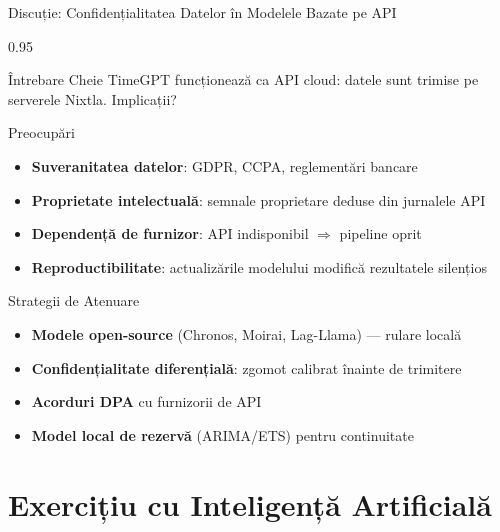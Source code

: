 \documentclass[9pt, aspectratio=169, t]{beamer}
\begin{document}
\begin{frame}{Discuție: Confidențialitatea Datelor în Modelele Bazate pe API}
    \begin{cminipage}{0.95\textwidth}
    {\scriptsize
    \begin{alertblock}{Întrebare Cheie}
        TimeGPT funcționează ca API cloud: datele sunt trimise pe serverele Nixtla. Implicații?
    \end{alertblock}
    \begin{block}{Preocupări}
        \begin{itemize}\setlength{\itemsep}{0pt}
            \item \textbf{Suveranitatea datelor}: GDPR, CCPA, reglementări bancare
            \item \textbf{Proprietate intelectuală}: semnale proprietare deduse din jurnalele API
            \item \textbf{Dependență de furnizor}: API indisponibil $\Rightarrow$ pipeline oprit
            \item \textbf{Reproductibilitate}: actualizările modelului modifică rezultatele silențios
        \end{itemize}
    \end{block}
    \begin{exampleblock}{Strategii de Atenuare}
        \begin{itemize}\setlength{\itemsep}{0pt}
            \item \textbf{Modele open-source} (Chronos, Moirai, Lag-Llama) --- rulare locală
            \item \textbf{Confidențialitate diferențială}: zgomot calibrat înainte de trimitere
            \item \textbf{Acorduri DPA} cu furnizorii de API
            \item \textbf{Model local de rezervă} (ARIMA/ETS) pentru continuitate
        \end{itemize}
    \end{exampleblock}
    }
    \end{cminipage}
\end{frame}

\section{Exercițiu cu Inteligență Artificială}
\end{document}
